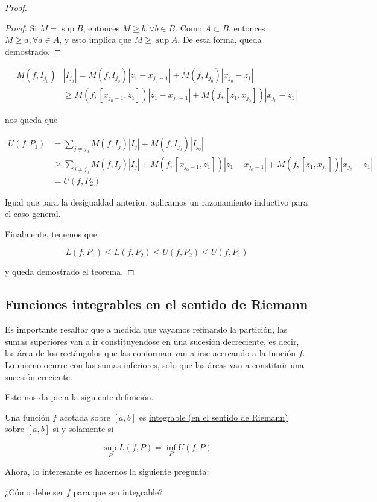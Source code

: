 \begin{proof}
{    \begin{proof}
    Si $M = \sup B$, entonces $M \geq b, \forall b \in B$. Como $A \subset B$, entonces $M \geq a, \forall a \in A$, y esto implica que $M \geq \sup A$. De esta forma, queda demostrado.
    \end{proof}}
    
    \begin{align*}
        M(f, I_{j_0})&|I_{j_0}| = M(f, I_{j_0})|z_1 - x_{j_0-1}| + M(f, I_{j_0})|x_{j_0} - z_1| \\
        &\geq M(f, [x_{j_0-1},z_1])|z_1 - x_{j_0-1}| + M(f, [z_1, x_{j_0}])|x_{j_0} - z_1|
    \end{align*}
    
    \noindent nos queda que
    
    \begin{align*}
        U(f, P_1) &= \sum_{j \neq j_0} M(f, I_j)|I_j| + M(f, I_{j_0})|I_{j_0}| \\
        &\geq \sum_{j \neq j_0} M(f, I_j)|I_j| + M(f, [x_{j_0-1},z_1])|z_1 - x_{j_0-1}| + M(f, [z_1, x_{j_0}])|x_{j_0} - z_1| \\
        &= U(f, P_2)
    \end{align*}
    
    Igual que para la desigualdad anterior, aplicamos un razonamiento inductivo para el caso general.
    
    Finalmente, tenemos que
    
    \[
    L(f, P_1) \leq L(f, P_2) \leq U(f, P_2) \leq U(f, P_1)
    \]
    
    \noindent y queda demostrado el teorema.
\end{proof}

\subsection{Funciones integrables en el sentido de Riemann}

Es importante resaltar que a medida que vayamos refinando la partición, las sumas superiores van a ir constituyendose en una sucesión decreciente, es decir, las área de los rectángulos que las conforman van a irse acercando a la función $f$. Lo mismo ocurre con las sumas inferiores, solo que las áreas van a constituir una sucesión creciente.

Esto nos da pie a la siguiente definición.

\begin{defn}
    Una función $f$ acotada sobre $[a,b]$ es \ul{integrable (en el sentido de Riemann)} sobre $[a,b]$ si y solamente si
    
    \[
    \sup_P L(f,P) = \inf_P U(f,P)
    \]
\end{defn}

Ahora, lo interesante es hacernos la siguiente pregunta:

\begin{pre}
    ¿Cómo debe ser $f$ para que sea integrable?
\end{pre}